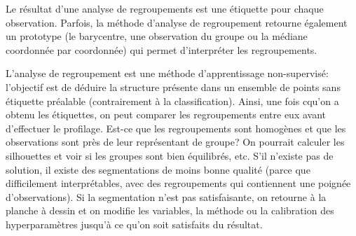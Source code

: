 \documentclass[
  11pt,
  letterpaper,
]{scrbook}
\theoremstyle{definition}
\theoremstyle{remark}
\begin{document}
Le résultat d'une analyse de regroupements est une étiquette pour chaque
observation. Parfois, la méthode d'analyse de regroupement retourne
également un prototype (le barycentre, une observation du groupe ou la
médiane coordonnée par coordonnée) qui permet d'interpréter les
regroupements.

L'analyse de regroupement est une méthode d'apprentissage non-supervisé:
l'objectif est de déduire la structure présente dans un ensemble de
points sans étiquette préalable (contrairement à la classification).
Ainsi, une fois cqu'on a obtenu les étiquettes, on peut comparer les
regroupements entre eux avant d'effectuer le profilage. Est-ce que les
regroupements sont homogènes et que les observations sont près de leur
représentant de groupe? On pourrait calculer les silhouettes et voir si
les groupes sont bien équilibrés, etc. S'il n'existe pas de solution, il
existe des segmentations de moins bonne qualité (parce que difficilement
interprétables, avec des regroupements qui contiennent une poignée
d'observations). Si la segmentation n'est pas satisfaisante, on retourne
à la planche à dessin et on modifie les variables, la méthode ou la
calibration des hyperparamètres jusqu'à ce qu'on soit satisfaits du
résultat.
\end{document}

